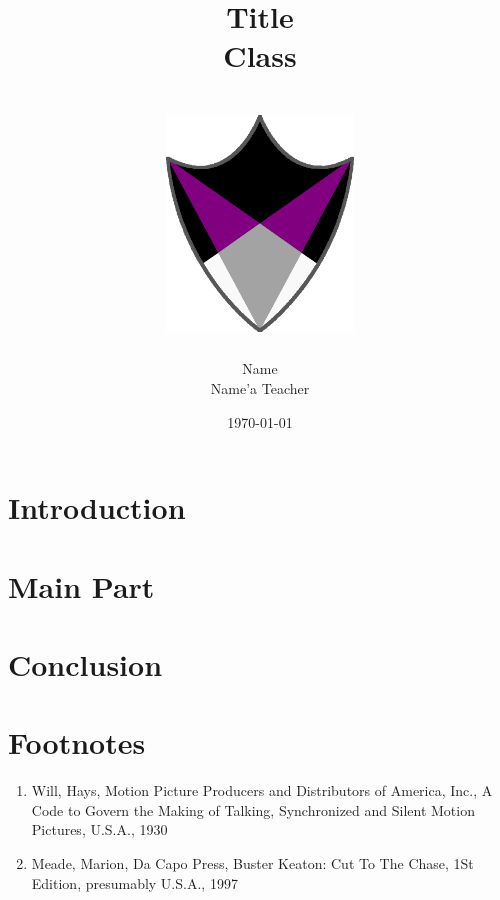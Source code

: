 \documentclass[11pt,a4paper]{article}
\title{
      {Title}\\
      {Class}\\
      {\hrulefill}\\
      {\vspace{1cm}}
      {\includegraphics[width=50mm,scale=1]{aceing_shield.png}}\\
      {\hrulefill}
      }
\author{Name\\Name'a Teacher}
\date{\today}
\begin{document}
\pagestyle{fancy}
\fancyhead{}
\fancyfoot[C]{\thepage}
\renewcommand{\headrulewidth}{1pt}
\renewcommand{\footrulewidth}{1pt}

\newcommand{\fakesection}[1]{%
  \par\refstepcounter{section}%
  \sectionmark{#1}%
  \addcontentsline{toc}{section}{\protect\numberline{\thesection}#1}%
}

\newcommand{\fakesubsection}[1]{%
  \par\refstepcounter{subsection}%
  \sectionmark{#1}%
  \addcontentsline{toc}{subsection}{\protect\numberline{\thesubsection}#1}%
}

\onehalfspacing
\maketitle
\thispagestyle{empty}
\newpage
\tableofcontents
\thispagestyle{empty}
\newpage


\section{Introduction}

\clearpage

\section{Main Part}

\clearpage

\section{Conclusion}

\clearpage

\section{Footnotes}

\renewcommand{\labelenumi}{\alph{enumi})} %
\begin{enumerate}
\item Will, Hays, Motion Picture Producers and Distributors of America, Inc., A Code to Govern the Making of Talking, Synchronized and Silent Motion Pictures, U.S.A., 1930
\item Meade, Marion,‎ Da Capo Press, Buster Keaton: Cut To The Chase, 1St Edition, presumably U.S.A., 1997
\end{enumerate}
\end{document}
